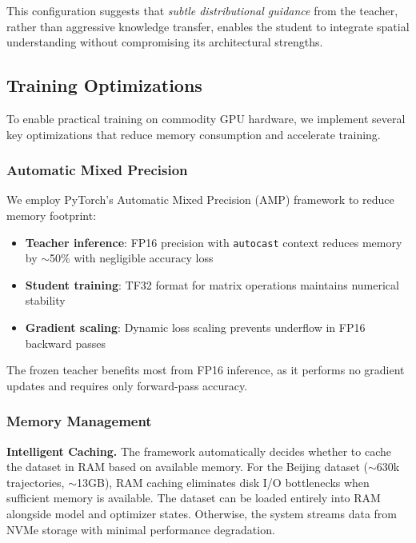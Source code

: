 This configuration suggests that \emph{subtle distributional guidance} from the teacher, rather than aggressive knowledge transfer, enables the student to integrate spatial understanding without compromising its architectural strengths.

\subsection{Training Optimizations}
\label{sec:impl-opt}

To enable practical training on commodity GPU hardware, we implement several key optimizations that reduce memory consumption and accelerate training.

\subsubsection{Automatic Mixed Precision}

We employ PyTorch's Automatic Mixed Precision (AMP) framework to reduce memory footprint:

\begin{itemize}[noitemsep,topsep=0pt]
    \item \textbf{Teacher inference}: FP16 precision with \texttt{autocast} context reduces memory by $\sim$50\% with negligible accuracy loss
    \item \textbf{Student training}: TF32 format for matrix operations maintains numerical stability
    \item \textbf{Gradient scaling}: Dynamic loss scaling prevents underflow in FP16 backward passes
\end{itemize}

The frozen teacher benefits most from FP16 inference, as it performs no gradient updates and requires only forward-pass accuracy.

\subsubsection{Memory Management}

\textbf{Intelligent Caching.} The framework automatically decides whether to cache the dataset in RAM based on available memory. For the Beijing dataset ($\sim$630k trajectories, $\sim$13GB), RAM caching eliminates disk I/O bottlenecks when sufficient memory is available. The dataset can be loaded entirely into RAM alongside model and optimizer states. Otherwise, the system streams data from NVMe storage with minimal performance degradation.

